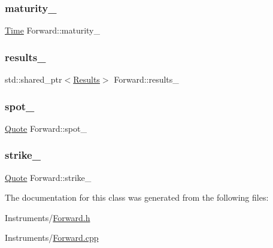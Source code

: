 \subsubsection{\texorpdfstring{maturity\+\_\+}{maturity\_}}
{\footnotesize\ttfamily \hyperlink{_name_def_8h_ac2d3e0ba793497bcca555c7c2cf64ff3}{Time} Forward\+::maturity\+\_\+\hspace{0.3cm}{\ttfamily [private]}}

\hypertarget{class_forward_abead12e748980177fb67f98bcffbf817}{}\label{class_forward_abead12e748980177fb67f98bcffbf817} 
\subsubsection{\texorpdfstring{results\+\_\+}{results\_}}
{\footnotesize\ttfamily std\+::shared\+\_\+ptr$<$\hyperlink{class_forward_1_1_results}{Results}$>$ Forward\+::results\+\_\+}

\hypertarget{class_forward_a362d0396ceda462e504f77120339f8b0}{}\label{class_forward_a362d0396ceda462e504f77120339f8b0} 
\subsubsection{\texorpdfstring{spot\+\_\+}{spot\_}}
{\footnotesize\ttfamily \hyperlink{_name_def_8h_a642a6c5fd87319d922637de0e0bb0305}{Quote} Forward\+::spot\+\_\+\hspace{0.3cm}{\ttfamily [private]}}

\hypertarget{class_forward_a17c32d0a673c13fd92288b1720a43b76}{}\label{class_forward_a17c32d0a673c13fd92288b1720a43b76} 
\subsubsection{\texorpdfstring{strike\+\_\+}{strike\_}}
{\footnotesize\ttfamily \hyperlink{_name_def_8h_a642a6c5fd87319d922637de0e0bb0305}{Quote} Forward\+::strike\+\_\+\hspace{0.3cm}{\ttfamily [private]}}



The documentation for this class was generated from the following files\+:\begin{DoxyCompactItemize}
\item 
Instruments/\hyperlink{_forward_8h}{Forward.\+h}\item 
Instruments/\hyperlink{_forward_8cpp}{Forward.\+cpp}\end{DoxyCompactItemize}

